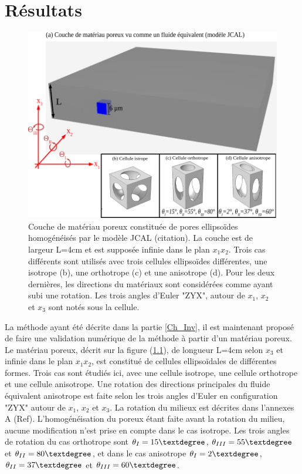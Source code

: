 \documentclass[12pt]{report}
\begin{document}
\chapter{Résultats}
\label{Ch_Res}
  \begin{figure}[ht!]
        \centering
        \includegraphics{Material_2.pdf}
        \caption{Couche de matériau poreux constituée de pores ellipsoïdes homogénéisés par le modèle JCAL (citation). La couche est de largeur L=4cm et est supposée infinie dans le plan $x_1x_2$. Trois cas différents sont utilisés avec trois cellules ellipsoïdes différentes, une isotrope (b), une orthotrope (c) et une anisotrope (d). Pour les deux dernières, les directions du matériaux sont considérées comme ayant subi une rotation. Les trois angles d'Euler "ZYX", autour de $x_1$, $x_2$ et $x_3$ sont notés sous la cellule. }
        \label{Porous_Mat}
    \end{figure}

    La méthode ayant été décrite dans la partie \ref{Ch_Inv}, il est maintenant proposé de faire une validation numérique de la méthode à partir d'un matériau poreux. Le matériau poreux, décrit sur la figure (\ref{Porous_Mat}), de longueur L=4cm selon $x_3$ et infinie dans le plan $x_1x_2$, est constitué de cellules ellipsoïdales de différentes formes. Trois cas sont étudiés ici, avec une cellule isotrope, une cellule orthotrope et une cellule anisotrope. Une rotation des directions principales du fluide équivalent anisotrope est faite selon les trois angles d'Euler en configuration "ZYX" autour de $x_1$, $x_2$ et $x_3$. La rotation du milieux est décrites dans l'annexes A (Ref). L'homogénéisation du poreux étant faite avant la rotation du milieu, aucune modification n'est prise en compte dans le cas isotrope. Les trois angles de rotation du cas orthotrope sont $\theta_I=15\textdegree$, $\theta_{III}=55\textdegree$ et $\theta_{II}=80\textdegree$, et dans le cas anisotrope $\theta_I=2\textdegree$, $\theta_{II}=37\textdegree$ et $\theta_{III}=60\textdegree$.
    
\end{document}
